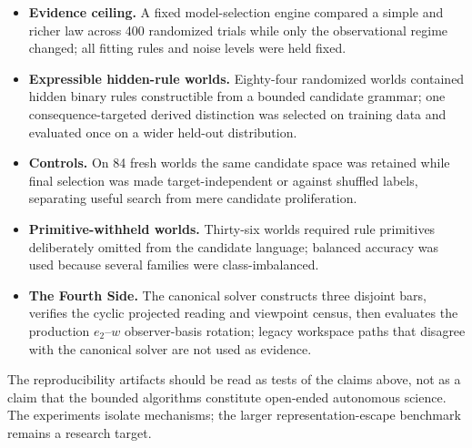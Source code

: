 \documentclass[11pt]{article}
\begin{document}
\begin{itemize}[leftmargin=1.5em]
\item \textbf{Evidence ceiling.} A fixed model-selection engine compared a simple and richer law across 400 randomized trials while only the observational regime changed; all fitting rules and noise levels were held fixed.
\item \textbf{Expressible hidden-rule worlds.} Eighty-four randomized worlds contained hidden binary rules constructible from a bounded candidate grammar; one consequence-targeted derived distinction was selected on training data and evaluated once on a wider held-out distribution.
\item \textbf{Controls.} On 84 fresh worlds the same candidate space was retained while final selection was made target-independent or against shuffled labels, separating useful search from mere candidate proliferation.
\item \textbf{Primitive-withheld worlds.} Thirty-six worlds required rule primitives deliberately omitted from the candidate language; balanced accuracy was used because several families were class-imbalanced.
\item \textbf{The Fourth Side.} The canonical solver constructs three disjoint bars, verifies the cyclic projected reading and viewpoint census, then evaluates the production $e_2$--$w$ observer-basis rotation; legacy workspace paths that disagree with the canonical solver are not used as evidence.
\end{itemize}

The reproducibility artifacts should be read as tests of the claims above, not as a claim that the bounded algorithms constitute open-ended autonomous science. The experiments isolate mechanisms; the larger representation-escape benchmark remains a research target.
\end{document}
